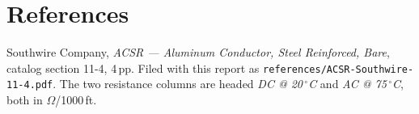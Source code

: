 \section{References}

\begin{enumerate}[label={[\arabic*]}]
  \item Southwire Company, \emph{ACSR --- Aluminum Conductor, Steel Reinforced,
        Bare}, catalog section 11-4, 4\,pp. Filed with this report as
        \texttt{references/ACSR-Southwire-11-4.pdf}. The two resistance columns
        are headed \emph{DC @ 20\,$^{\circ}$C} and \emph{AC @ 75\,$^{\circ}$C},
        both in $\Omega$/1000\,ft.
\end{enumerate}
